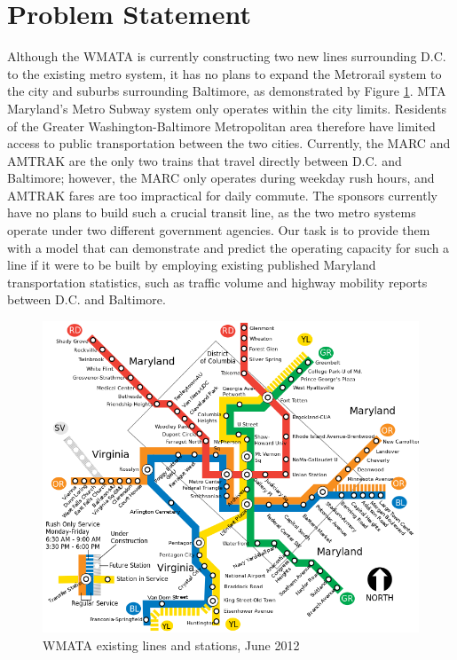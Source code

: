 \documentclass[12pt,letterpaper]{article}
\theoremstyle{definition}
\begin{document}
\section{Problem Statement}
Although the WMATA is currently constructing two new lines surrounding D.C. to the existing metro system, it has no plans to expand the Metrorail system to the city and suburbs surrounding Baltimore, as demonstrated by Figure \ref{fig:wmatamap}. MTA Maryland's Metro Subway system only operates within the city limits. Residents of the Greater Washington-Baltimore Metropolitan area therefore have limited access to public transportation between the two cities. Currently, the MARC and AMTRAK are the only two trains that travel directly between D.C. and Baltimore; however, the MARC only operates during weekday rush hours, and AMTRAK fares are too impractical for daily commute. 
The sponsors currently have no plans to build such a crucial transit line, as the two metro systems operate under two different government agencies. Our task is to provide them with a model that can demonstrate and predict the operating capacity for such a line if it were to be built by employing existing published Maryland transportation statistics, such as traffic volume and highway mobility reports between D.C. and Baltimore.
\begin{figure}[h]
    \begin{center}
        \includegraphics[width=\textwidth]{WMATA_system_map.png}
    \end{center}
    \caption{WMATA existing lines and stations, June 2012}
    \label{fig:wmatamap}
\end{figure}
\end{document}
